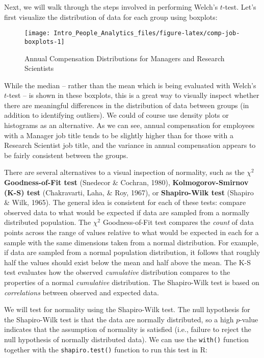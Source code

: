 \documentclass[
]{book}
\begin{document}
Next, we will walk through the steps involved in performing Welch's \(t\)-test. Let's first visualize the distribution of data for each group using boxplots:

\begin{figure}

{\centering \texttt{[image: Intro\_People\_Analytics\_files/figure-latex/comp-job-boxplots-1]} 

}

\caption{Annual Compensation Distributions for Managers and Research Scientists}\label{fig:comp-job-boxplots}
\end{figure}

While the median -- rather than the mean which is being evaluated with Welch's \(t\)-test -- is shown in these boxplots, this is a great way to visually inspect whether there are meaningful differences in the distribution of data between groups (in addition to identifying outliers). We could of course use density plots or histograms as an alternative. As we can see, annual compensation for employees with a Manager job title tends to be slightly higher than for those with a Research Scientist job title, and the variance in annual compensation appears to be fairly consistent between the groups.

There are several alternatives to a visual inspection of normality, such as the \({\chi}^2\) \textbf{Goodness-of-Fit test} (Snedecor \& Cochran, 1980), \textbf{Kolmogorov-Smirnov (K-S) test} (Chakravarti, Laha, \& Roy, 1967), or \textbf{Shapiro-Wilk test} (Shapiro \& Wilk, 1965). The general idea is consistent for each of these tests: compare observed data to what would be expected if data are sampled from a normally distributed population. The \({\chi}^2\) Goodness-of-Fit test compares the \emph{count} of data points across the range of values relative to what would be expected in each for a sample with the same dimensions taken from a normal distribution. For example, if data are sampled from a normal population distribution, it follows that roughly half the values should exist below the mean and half above the mean. The K-S test evaluates how the observed \emph{cumulative} distribution compares to the properties of a normal \emph{cumulative} distribution. The Shapiro-Wilk test is based on \emph{correlations} between observed and expected data.

We will test for normality using the Shapiro-Wilk test. The null hypothesis for the Shapiro-Wilk test is that the data are normally distributed, so a high \(p\)-value indicates that the assumption of normality is satisfied (i.e., failure to reject the null hypothesis of normally distributed data). We can use the \texttt{with()} function together with the \texttt{shapiro.test()} function to run this test in R:
\end{document}
